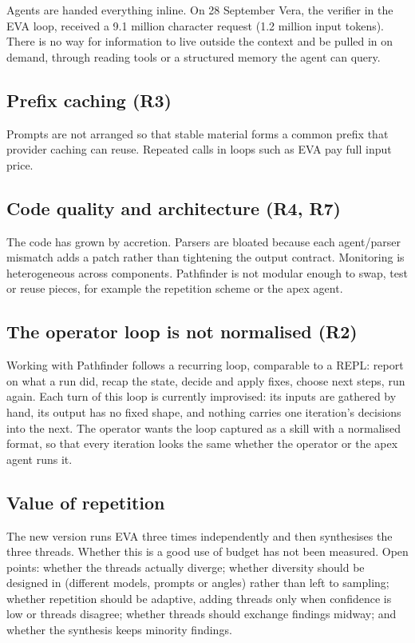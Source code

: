 \documentclass[11pt,a4paper]{article}
\begin{document}
Agents are handed everything inline. On 28 September Vera, the verifier in the EVA
loop, received a 9.1 million character request (1.2 million input tokens). There is
no way for information to live outside the context and be pulled in on demand,
through reading tools or a structured memory the agent can query.

\subsection{Prefix caching (R3)}

Prompts are not arranged so that stable material forms a common prefix that
provider caching can reuse. Repeated calls in loops such as EVA pay full input
price.

\subsection{Code quality and architecture (R4, R7)}

The code has grown by accretion. Parsers are bloated because each agent/parser
mismatch adds a patch rather than tightening the output contract. Monitoring is
heterogeneous across components. Pathfinder is not modular enough to swap, test
or reuse pieces, for example the repetition scheme or the apex agent.

\subsection{The operator loop is not normalised (R2)}

Working with Pathfinder follows a recurring loop, comparable to a REPL: report on
what a run did, recap the state, decide and apply fixes, choose next steps, run
again. Each turn of this loop is currently improvised: its inputs are gathered by
hand, its output has no fixed shape, and nothing carries one iteration's
decisions into the next. The operator wants the loop captured as a skill with a
normalised format, so that every iteration looks the same whether the operator
or the apex agent runs it.

\subsection{Value of repetition}

The new version runs EVA three times independently and then synthesises the three
threads. Whether this is a good use of budget has not been measured. Open points:
whether the threads actually diverge; whether diversity should be designed in
(different models, prompts or angles) rather than left to sampling; whether
repetition should be adaptive, adding threads only when confidence is low or
threads disagree; whether threads should exchange findings midway; and whether the
synthesis keeps minority findings.
\end{document}
